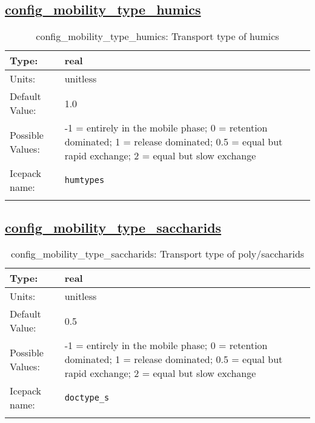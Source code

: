 \subsection[config\_mobility\_type\_humics]{\hyperref[sec:nm_tab_biogeochemistry]{config\_mobility\_type\_humics}}
\label{subsec:nm_sec_config_mobility_type_humics}
\begin{center}
\begin{longtable}{| p{2.0in} || p{4.0in} |}
    \hline
    Type: & real \\
    \hline
    Units: & \si{unitless} \\
    \hline
    Default Value: & 1.0 \\
    \hline
    Possible Values: & -1 = entirely in the mobile phase; 0 = retention dominated; 1 = release dominated; 0.5 = equal but rapid exchange; 2 = equal but slow exchange \\
    \hline
    \hline
    Icepack name: & \verb+humtypes+ \\
    \caption{config\_mobility\_type\_humics: Transport type of humics}
\end{longtable}
\end{center}
\subsection[config\_mobility\_type\_saccharids]{\hyperref[sec:nm_tab_biogeochemistry]{config\_mobility\_type\_saccharids}}
\label{subsec:nm_sec_config_mobility_type_saccharids}
\begin{center}
\begin{longtable}{| p{2.0in} || p{4.0in} |}
    \hline
    Type: & real \\
    \hline
    Units: & \si{unitless} \\
    \hline
    Default Value: & 0.5 \\
    \hline
    Possible Values: & -1 = entirely in the mobile phase; 0 = retention dominated; 1 = release dominated; 0.5 = equal but rapid exchange; 2 = equal but slow exchange \\
    \hline
    \hline
    Icepack name: & \verb+doctype_s+ \\
    \caption{config\_mobility\_type\_saccharids: Transport type of poly/saccharids}
\end{longtable}
\end{center}
